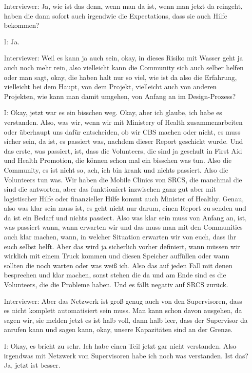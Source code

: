 Interviewer: Ja, wie ist das denn, wenn man da ist, wenn man jetzt da reingeht, haben die dann sofort auch irgendwie die Expectations, dass sie auch Hilfe bekommen? 

I: Ja.

Interviewer: Weil es kann ja auch sein, okay, in dieses Risiko mit Wasser geht ja auch noch mehr rein, also vielleicht kann die Community sich auch selber helfen oder man sagt, okay, die haben halt nur so viel, wie ist da also die Erfahrung, vielleicht bei dem Haupt, von dem Projekt, vielleicht auch von anderen Projekten, wie kann man damit umgehen, von Anfang an im Design-Prozess? 

I: Okay, jetzt war es ein bisschen weg. Okay, aber ich glaube, ich habe es verstanden. Also, was wir, wenn wir mit Ministery of Health zusammenarbeiten oder {\"u}berhaupt uns daf{\"u}r entscheiden, ob wir CBS machen oder nicht, es muss sicher sein, da ist, es passiert was, nachdem dieser Report geschickt wurde. Und das erste, was passiert, ist, dass die Volunteers, die sind ja geschult in First Aid und Health Promotion, die k{\"o}nnen schon mal ein bisschen was tun. Also die Community, es ist nicht so, ach, ich bin krank und nichts passiert. Also die Volunteers tun was. Wir haben die Mobile Clinics von SRCS, die manchmal die sind die antworten, aber das funktioniert inzwischen ganz gut aber mit logistischer Hilfe oder finanzieller Hilfe kommt auch Minister of Healthy. Genau, also was klar sein muss ist, es geht nicht nur darum, einen Report zu senden und da ist ein Bedarf und nichts passiert. Also was klar sein muss von Anfang an, ist, was passiert wann, wann erwarten wir und das muss man mit den Communities auch klar machen, wann, in welcher Situation erwarten wir von euch, dass ihr euch selbst helft. Aber das wird ja sicherlich vorher definiert, wann m{\"u}ssen wir wirklich mit einem Truck kommen und diesen Speicher auff{\"u}llen oder wann sollten die noch warten oder was weiß ich. Also das auf jeden Fall mit denen besprechen und klar machen, sonst stehen die da und am Ende sind es die Volunteers, die die Probleme haben. Und es f{\"a}llt negativ auf SRCS zur{\"u}ck.

Interviewer: Aber das Netzwerk ist groß genug auch von den Supervisoren, dass es nicht komplett automatisiert sein muss. Man kann schon davon ausgehen, da sagen wir, sie melden jetzt es ist halb voll, dann halb leer, dass der Supervisor da anrufen kann und sagen kann, okay, unsere Kapazit{\"a}ten sind an der Grenze.

I: Okay, es bricht zu sehr. Ich habe einen Teil jetzt gar nicht verstanden. Also irgendwas mit Netzwerk von Supervisoren habe ich noch was verstanden. Ist das? Ja, jetzt ist besser. 

